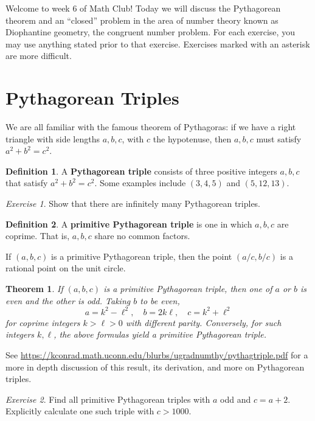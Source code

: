 \documentclass{article}
\newtheorem{theorem}{Theorem}%
\theoremstyle{definition}
\newtheorem{definition}{Definition}%
\theoremstyle{remark}
\newtheorem{exercise}{Exercise}
\begin{document}
Welcome to week 6 of Math Club!
Today we will discuss the Pythagorean theorem and an ``closed'' problem in the area of number theory known as Diophantine geometry, the congruent number problem.
For each exercise, you may use anything stated prior to that exercise.
Exercises marked with an asterisk are more difficult.

\section{Pythagorean Triples}

We are all familiar with the famous theorem of Pythagoras: if we have a right triangle with side lengths \(a,b,c\), with \(c\) the hypotenuse, then \(a,b,c\) must satisfy \(a^2+b^2=c^2\).

\begin{definition}
	A \textbf{Pythagorean triple} consists of three positive integers \(a,b,c\) that satisfy \(a^2+b^2=c^2\).
	Some examples include \((3,4,5)\) and \((5,12,13)\).
\end{definition}

\begin{exercise}
	Show that there are infinitely many Pythagorean triples.
\end{exercise}

\begin{definition}
	A \textbf{primitive Pythagorean triple} is one in which \(a,b,c\) are coprime.
	That is, \(a,b,c\) share no common factors.
\end{definition}

If \((a,b,c)\) is a primitive Pythagorean triple, then the point \((a/c,b/c)\) is a rational point on the unit circle.

\begin{theorem}
	If \((a,b,c)\) is a primitive Pythagorean triple, then one of \(a\) or \(b\) is even and the other is odd.
	Taking \(b\) to be even, 
	\[a=k^2-\ell^2,\quad b=2k\ell,\quad c=k^2+\ell^2\]
	for coprime integers \(k>\ell>0\) with different parity.
	Conversely, for such integers \(k,\ell\), the above formulas yield a primitive Pythagorean triple.
\end{theorem}

See \url{https://kconrad.math.uconn.edu/blurbs/ugradnumthy/pythagtriple.pdf} for a more in depth discussion of this result, its derivation, and more on Pythagorean triples.

\begin{exercise}
	Find all primitive Pythagorean triples with \(a\) odd and \(c=a+2\).
	Explicitly calculate one such triple with \(c>1000\).
\end{exercise}
\end{document}
